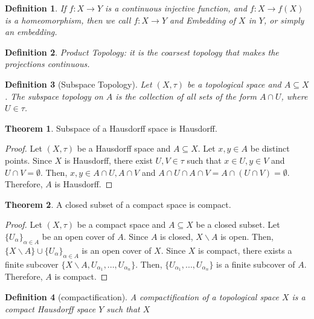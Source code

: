 \documentclass{article}
\newtheorem{definition}{Definition}[subsection]
\theoremstyle{definition}
\newtheorem{theorem}{Theorem}
\begin{document}
\begin{definition}
    If $f: X \rightarrow Y$ is a continuous injective function, and $f: X \rightarrow f(X)$ is a homeomorphism, then we call $f: X \rightarrow Y$ and Embedding of $X$ in $Y$, or simply an embedding.
\end{definition}
\begin{definition}
    Product Topology: it is the coarsest topology that makes the projections continuous.
\end{definition}

\begin{definition}[Subspace Topology]
    Let $(X, \tau)$ be a topological space and $A \subseteq X$. The subspace topology on $A$ is the collection of all sets of the form $A \cap U$, where $U \in \tau$.
    
\end{definition}

\begin{theorem}
    Subspace of a Hausdorff space is Hausdorff.
\end{theorem}

\begin{proof}
    Let $(X, \tau)$ be a Hausdorff space and $A \subseteq X$. Let $x, y \in A$ be distinct points. Since $X$ is Hausdorff, there exist $U, V \in \tau$ such that $x \in U, y \in V$ and $U \cap V = \emptyset$. Then, $x, y \in A \cap U, A \cap V$ and $A \cap U \cap A \cap V = A \cap (U \cap V) = \emptyset$. Therefore, $A$ is Hausdorff.
\end{proof}

\begin{theorem}
    A closed subset of a compact space is compact.
\end{theorem}

\begin{proof}
    Let $(X, \tau)$ be a compact space and $A \subseteq X$ be a closed subset. Let $\{U_\alpha\}_{\alpha \in A}$ be an open cover of $A$. Since $A$ is closed, $X \backslash A$ is open. Then, $\{X \backslash A\} \cup \{U_\alpha\}_{\alpha \in A}$ is an open cover of $X$. Since $X$ is compact, there exists a finite subcover $\{X \backslash A, U_{\alpha_1}, ..., U_{\alpha_n}\}$. Then, $\{U_{\alpha_1}, ..., U_{\alpha_n}\}$ is a finite subcover of $A$. Therefore, $A$ is compact.
\end{proof}

\begin{definition}[compactification]
    A compactification of a topological space $X$ is a compact Hausdorff space $Y$ such that $X$ 
    
\end{definition}
\end{document}
